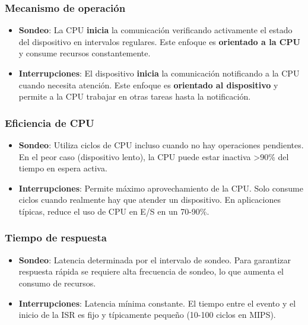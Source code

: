 \documentclass[12pt]{article}
\begin{document}
\subsubsection*{Mecanismo de operación}
\begin{itemize}
    \item \textbf{Sondeo}: La CPU \textbf{inicia} la comunicación verificando activamente el estado del dispositivo en intervalos regulares. Este enfoque es \textbf{orientado a la CPU} y consume recursos constantemente.
    
    \item \textbf{Interrupciones}: El dispositivo \textbf{inicia} la comunicación notificando a la CPU cuando necesita atención. Este enfoque es \textbf{orientado al dispositivo} y permite a la CPU trabajar en otras tareas hasta la notificación.
\end{itemize}

\subsubsection*{Eficiencia de CPU}
\begin{itemize}
    \item \textbf{Sondeo}: Utiliza ciclos de CPU incluso cuando no hay operaciones pendientes. En el peor caso (dispositivo lento), la CPU puede estar inactiva >90\% del tiempo en espera activa.
    
    \item \textbf{Interrupciones}: Permite máximo aprovechamiento de la CPU. Solo consume ciclos cuando realmente hay que atender un dispositivo. En aplicaciones típicas, reduce el uso de CPU en E/S en un 70-90\%.
\end{itemize}

\subsubsection*{Tiempo de respuesta}
\begin{itemize}
    \item \textbf{Sondeo}: Latencia determinada por el intervalo de sondeo. Para garantizar respuesta rápida se requiere alta frecuencia de sondeo, lo que aumenta el consumo de recursos.
    
    \item \textbf{Interrupciones}: Latencia mínima constante. El tiempo entre el evento y el inicio de la ISR es fijo y típicamente pequeño (10-100 ciclos en MIPS).
\end{itemize}
\end{document}
